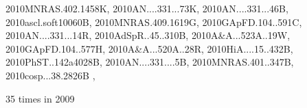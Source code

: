 \documentclass[12pt]{article}
\begin{document}
\begin{description}
{2010MNRAS.402.1458K,%
2010AN....331...73K,%
2010AN....331...46B,%
2010ascl.soft10060B,%
2010MNRAS.409.1619G,%
2010GApFD.104..591C,%
2010AN....331...14R,%
2010AdSpR..45..310B,%
2010A&A...523A..19W,%
2010GApFD.104..577H,%
2010A&A...520A..28R,%
2010HiA....15..432B,%
2010PhST..142a4028B,%
2010AN....331....5B,%
2010MNRAS.401..347B,%
2010cosp...38.2826B%
},\item
35 times in 2009 \citep{
2009ApJ...707.1233Y,%
2009PhRvE..80e5301B,%
2009MNRAS.400..509R,%
2009ApJ...704.1239O,%
2009A&A...505..955S,%
2009ApJ...701.1269B,%
2009AN....330..797V,%
2009MNRAS.397...64H,%
}
\end{description}
\end{document}
